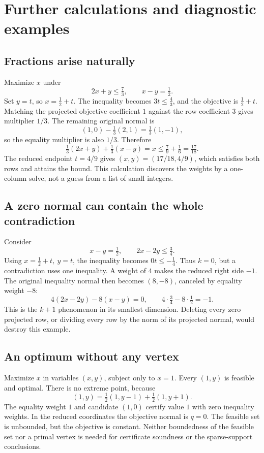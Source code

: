 \documentclass[11pt,letterpaper]{article}
\theoremstyle{definition}
\theoremstyle{remark}
\numberwithin{equation}{section}
\begin{document}
\section{Further calculations and diagnostic examples}
\label{sec:examples}

\subsection{Fractions arise naturally}

Maximize \(x\) under
\[
 2x+y\le\tfrac73,\qquad x-y=\tfrac12.
\]
Set \(y=t\), so \(x=\tfrac12+t\). The inequality becomes
\(3t\le\tfrac43\), and the objective is \(\tfrac12+t\).
Matching the projected objective coefficient \(1\) against the row
coefficient \(3\) gives multiplier \(1/3\).
The remaining original normal is
\[
 (1,0)-\tfrac13(2,1)=\tfrac13(1,-1),
\]
so the equality multiplier is also \(1/3\). Therefore
\begin{equation}\label{eq:fraction-example}
 \tfrac13(2x+y)+\tfrac13(x-y)=x
 \le\tfrac79+\tfrac16=\tfrac{17}{18}.
\end{equation}
The reduced endpoint \(t=4/9\) gives
\((x,y)=(17/18,4/9)\), which satisfies both rows and attains the bound.
This calculation discovers the weights by a one-column solve, not a guess
from a list of small integers.

\subsection{A zero normal can contain the whole contradiction}

Consider
\[
 x-y=\tfrac12,\qquad 2x-2y\le\tfrac34.
\]
Using \(x=\tfrac12+t,\ y=t\), the inequality becomes
\(0t\le-\tfrac14\). Thus \(k=0\), but a contradiction uses one inequality.
A weight of \(4\) makes the reduced right side \(-1\). The original
inequality normal then becomes \((8,-8)\), canceled by equality weight
\(-8\):
\[
 4(2x-2y)-8(x-y)=0,\qquad
 4\cdot\tfrac34-8\cdot\tfrac12=-1.
\]
This is the \(k+1\) phenomenon in its smallest dimension.
Deleting every zero projected row, or dividing every row by the norm of its
projected normal, would destroy this example.

\subsection{An optimum without any vertex}

Maximize \(x\) in variables \((x,y)\), subject only to \(x=1\).
Every \((1,y)\) is feasible and optimal. There is no extreme point, because
\[
 (1,y)=\tfrac12(1,y-1)+\tfrac12(1,y+1).
\]
The equality weight \(1\) and candidate \((1,0)\) certify value \(1\)
with zero inequality weights. In the reduced coordinates the objective
normal is \(q=0\). The feasible set is unbounded, but the objective is
constant. Neither boundedness of the feasible set nor a primal vertex is
needed for certificate soundness or the sparse-support conclusions.
\end{document}
